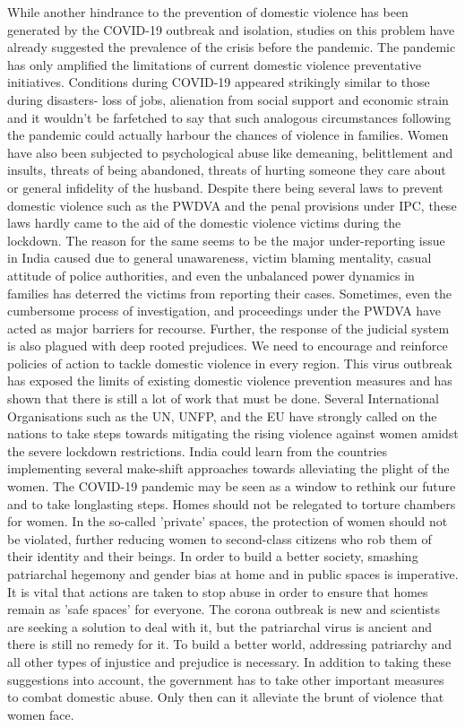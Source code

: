 \begin{multicols}{2}
\noi
While another hindrance to the prevention of domestic violence has been generated by the
COVID-19 outbreak and isolation, studies on this problem have already suggested the
prevalence of the crisis before the pandemic. The pandemic has only amplified the limitations
of current domestic violence preventative initiatives. Conditions during COVID-19 appeared
strikingly similar to those during disasters- loss of jobs, alienation from social support and
economic strain and it wouldn’t be farfetched to say that such analogous circumstances
following the pandemic could actually harbour the chances of violence in families. Women have also been subjected to psychological abuse like demeaning, belittlement and insults,
threats of being abandoned, threats of hurting someone they care about or general infidelity
of the husband. Despite there being several laws to prevent domestic violence such as the
PWDVA and the penal provisions under IPC, these laws hardly came to the aid of the
domestic violence victims during the lockdown. The reason for the same seems to be the
major under-reporting issue in India caused due to general unawareness, victim blaming
mentality, casual attitude of police authorities, and even the unbalanced power dynamics in
families has deterred the victims from reporting their cases. Sometimes, even the
cumbersome process of investigation, and proceedings under the PWDVA have acted as
major barriers for recourse. Further, the response of the judicial system is also plagued with
deep rooted prejudices. We need to encourage and reinforce policies of action to tackle
domestic violence in every region. This virus outbreak has exposed the limits of existing
domestic violence prevention measures and has shown that there is still a lot of work that
must be done. Several International Organisations such as the UN, UNFP, and the EU have
strongly called on the nations to take steps towards mitigating the rising violence against
women amidst the severe lockdown restrictions. India could learn from the countries
implementing several make-shift approaches towards alleviating the plight of the women.
The COVID-19 pandemic may be seen as a window to rethink our future and to take longlasting steps. Homes should not be relegated to torture chambers for women. In the so-called
'private' spaces, the protection of women should not be violated, further reducing women to
second-class citizens who rob them of their identity and their beings. In order to build a better
society, smashing patriarchal hegemony and gender bias at home and in public spaces is
imperative. It is vital that actions are taken to stop abuse in order to ensure that homes remain
as 'safe spaces' for everyone. The corona outbreak is new and scientists are seeking a solution
to deal with it, but the patriarchal virus is ancient and there is still no remedy for it. To build a
better world, addressing patriarchy and all other types of injustice and prejudice is necessary.
In addition to taking these suggestions into account, the government has to take other
important measures to combat domestic abuse. Only then can it alleviate the brunt of violence
that women face. 
\end{multicols}
